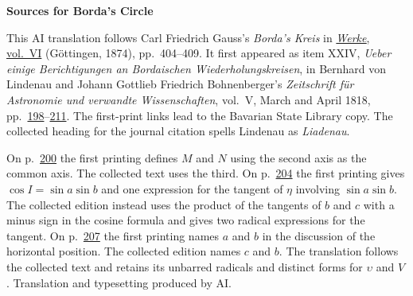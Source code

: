 \clearpage\thispagestyle{empty}
\begin{center}\textbf{Sources for Borda’s Circle}\end{center}
\noindent This AI translation follows Carl Friedrich Gauss’s \textit{Borda’s Kreis} in \href{https://gdz.sub.uni-goettingen.de/id/PPN236007467}{\textit{Werke}, vol.~VI} (Göttingen, 1874), pp.~404--409. It first appeared as item XXIV, \textit{Ueber einige Berichtigungen an Bordaischen Wiederholungskreisen}, in Bernhard von Lindenau and Johann Gottlieb Friedrich Bohnenberger’s \textit{Zeitschrift für Astronomie und verwandte Wissenschaften}, vol.~V, March and April 1818, pp.~\href{https://api.digitale-sammlungen.de/iiif/image/v2/bsb10061007_00208/full/1600,/0/default.jpg}{198}--\href{https://api.digitale-sammlungen.de/iiif/image/v2/bsb10061007_00221/full/1600,/0/default.jpg}{211}. The first-print links lead to the Bavarian State Library copy. The collected heading for the journal citation spells Lindenau as \textit{Liadenau}.
\par\smallskip\noindent On p.~\href{https://api.digitale-sammlungen.de/iiif/image/v2/bsb10061007_00210/full/1600,/0/default.jpg}{200} the first printing defines $M$ and $N$ using the second axis as the common axis. The collected text uses the third. On p.~\href{https://api.digitale-sammlungen.de/iiif/image/v2/bsb10061007_00214/full/1600,/0/default.jpg}{204} the first printing gives $\cos I=\sin a\sin b$ and one expression for the tangent of $\eta$ involving $\sin a\sin b$. The collected edition instead uses the product of the tangents of $b$ and $c$ with a minus sign in the cosine formula and gives two radical expressions for the tangent. On p.~\href{https://api.digitale-sammlungen.de/iiif/image/v2/bsb10061007_00217/full/1600,/0/default.jpg}{207} the first printing names $a$ and $b$ in the discussion of the horizontal position. The collected edition names $c$ and $b$. The translation follows the collected text and retains its unbarred radicals and distinct forms for $\upsilon$ and $V$. Translation and typesetting produced by AI.
\clearpage
